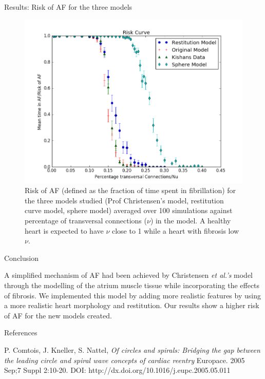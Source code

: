\documentclass[final,hyperref={pdfpagelabels=false}]{beamer}
\begin{document}
\begin{frame}[t]
\begin{columns}[t]
\begin{column}{.465\textwidth}
\begin{block}{Results: Risk of AF for the three models}
\begin{figure}
\includegraphics[width=0.65\linewidth]{xriskcurvesphere}
\caption{Risk of AF (defined as the fraction of time spent in fibrillation) for the three models studied (Prof Christensen's model, restitution curve model, sphere model) averaged over 100 simulations against percentage of transversal connections ($\nu$) in the model. A healthy heart is expected to have $\nu$ close to 1 while a heart with fibrosis low $\nu$.}
\end{figure}

\end{block}


\begin{block}{Conclusion}

A simplified mechanism of AF had been achieved by Christensen \emph{et al.'s} model through the modelling of the atrium muscle tissue while incorporating the effects of fibrosis. We implemented this model by adding more realistic features by using a more realistic heart morphology and restitution. Our results show a higher risk of AF for the new models created.

\end{block}


\begin{block}{References}
\begin{thebibliography}{1}

P. Comtois, J. Kneller, S. Nattel,
\emph{Of circles and spirals: Bridging the gap between the leading circle and spiral wave concepts of cardiac reentry}
Europace. 2005 Sep;7 Suppl 2:10-20.
DOI: http://dx.doi.org/10.1016/j.eupc.2005.05.011




\end{thebibliography}
\end{block}
\end{column}
\end{columns}
\end{frame}
\end{document}
